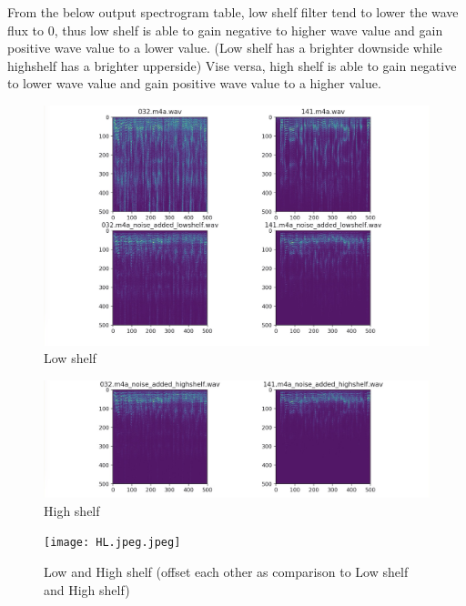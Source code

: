 \documentclass[runningheads,a4paper]{llncs}
\begin{document}
From the below output spectrogram table, low shelf filter tend to lower the wave flux to 0, thus low shelf is able to gain negative to higher wave value and gain positive wave value to a lower value. (Low shelf has a brighter downside while highshelf has a brighter upperside) Vise versa, high shelf is able to gain negative to lower wave value and gain positive wave value to a higher value.\\

\begin{figure}[h!]
\includegraphics[scale=0.30]{orig_low.jpeg}
\caption{Low shelf}
\label{fig:framework}
\end{figure}

\begin{figure}[h!]
\includegraphics[scale=0.30]{high.jpeg}
\caption{High shelf}
\label{fig:framework}
\end{figure}

\begin{figure}[h!]
\texttt{[image: HL.jpeg.jpeg]}
\caption{Low and High shelf (offset each other as comparison to Low shelf and High shelf)}
\label{fig:framework}
\end{figure}
\end{document}
